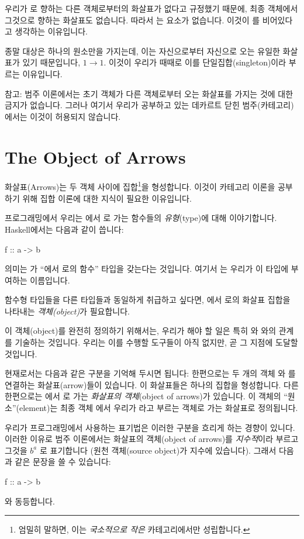 \documentclass[DaoFP]{subfiles}
\begin{document}
우리가 로 향하는 다른 객체로부터의 화살표가 없다고 규정했기 때문에, 최종 객체에서 그것으로 향하는 화살표도 없습니다. 따라서 는 요소가 없습니다. 이것이 를 비어있다고 생각하는 이유입니다.

종말 대상은 하나의 원소만을 가지는데, 이는 자신으로부터 자신으로 오는 유일한 화살표가 있기 때문입니다, $ 1 \to 1$. 이것이 우리가 때때로 이를 단일집합(singleton)이라 부르는 이유입니다.

참고: 범주 이론에서는 초기 객체가 다른 객체로부터 오는 화살표를 가지는 것에 대한 금지가 없습니다. 그러나 여기서 우리가 공부하고 있는 데카르트 닫힌 범주(카테고리)에서는 이것이 허용되지 않습니다.

\section{The Object of Arrows}

화살표(Arrows)는 두 객체 사이에 집합\footnote{엄밀히 말하면, 이는 \emph{국소적으로 작은} 카테고리에서만 성립합니다.}을 형성합니다. 이것이 카테고리 이론을 공부하기 위해 집합 이론에 대한 지식이 필요한 이유입니다.

프로그래밍에서 우리는 에서 로 가는 함수들의 \emph{유형}(type)에 대해 이야기합니다. Haskell에서는 다음과 같이 씁니다:
\begin{haskell}
f :: a -> b
\end{haskell}
의미는 가 ``에서 로의 함수'' 타입을 갖는다는 것입니다. 여기서 는 우리가 이 타입에 부여하는 이름입니다.

함수형 타입들을 다른 타입들과 동일하게 취급하고 싶다면, 에서 로의 화살표 집합을 나타내는 \emph{객체(object)}가 필요합니다.

이 객체(object)를 완전히 정의하기 위해서는, 우리가 해야 할 일은 특히 와 와의 관계를 기술하는 것입니다. 우리는 이를 수행할 도구들이 아직 없지만, 곧 그 지점에 도달할 것입니다.

현재로서는 다음과 같은 구분을 기억해 두시면 됩니다: 한편으로는 두 개의 객체 와 를 연결하는 화살표(arrow)들이 있습니다. 이 화살표들은 하나의 집합을 형성합니다. 다른 한편으로는 에서 로 가는 \emph{화살표의 객체}(object of arrows)가 있습니다. 이 객체의 ``원소''(element)는 최종 객체 \hask{()}에서 우리가 라고 부르는 객체로 가는 화살표로 정의됩니다.

우리가 프로그래밍에서 사용하는 표기법은 이러한 구분을 흐리게 하는 경향이 있니다. 이러한 이유로 범주 이론에서는 화살표의 객체(object of arrows)를 \emph{지수적}이라 부르고 그것을 $ b^a$ 로 표기합니다 (원천 객체(source object)가 지수에 있습니다). 그래서 다음과 같은 문장을 쓸 수 있습니다:
\begin{haskell}
f :: a -> b
\end{haskell}
와 동등합니다.
\end{document}
